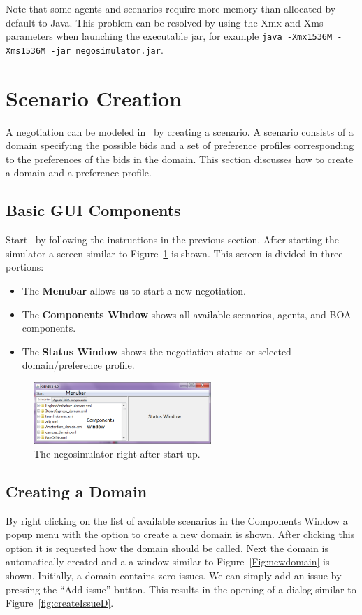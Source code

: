 \documentclass[]{article}
\begin{document}
Note that some agents and scenarios require more memory than allocated by default to Java. This problem can be resolved by using the Xmx and Xms parameters when launching the executable jar, for example \texttt{java -Xmx1536M -Xms1536M -jar negosimulator.jar}.

\section{Scenario Creation}
A negotiation can be modeled in \Genius~by creating a scenario. A scenario consists of a domain specifying the possible bids and a set of preference profiles corresponding to the preferences of the bids in the domain. This section discusses how to create a domain and a preference profile.

\subsection{Basic GUI Components}
Start \Genius~by following the instructions in the previous section. After starting the simulator a screen similar to Figure~\ref{Fig:negosimulator start} is shown. This screen is divided in three portions:

\begin{itemize}
	\item The \textbf{Menubar} allows us to start a new negotiation.
	\item The \textbf{Components Window} shows all available scenarios, agents, and BOA components.
	\item The \textbf{Status Window} shows the negotiation status or selected domain/preference profile.
\end{itemize}

\begin{figure}[htb]
	\centering
	\includegraphics[width=0.6\textwidth]{media/image6.png}
\caption{The negosimulator right after start-up.}\label{Fig:negosimulator start}
\end{figure}

\subsection{Creating a Domain}
By right clicking on the list of available scenarios in the Components Window a popup menu with the option to create a new domain is shown. After clicking this option it is requested how the domain should be called. Next the domain is automatically created and a a window similar to Figure~\ref{Fig:newdomain} is shown. Initially, a domain contains zero issues. We can simply add an issue by pressing the ``Add issue'' button. This results in the opening of a dialog similar to Figure~\ref{fig:createIssueD}.
\end{document}
